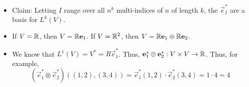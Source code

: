 \documentclass[../notes.tex]{subfiles}
\begin{document}
\begin{itemize}
    \item Claim: Letting $I$ range over all $n^k$ multi-indices of $n$ of length $k$, the $\vec{e}_I^*$ are a basis for $L^k(V)$.
    \item If $V=\mathbb{R}$, then $V=\mathbb{R}\mathbf{e}_1$. If $V=\mathbb{R}^2$, then $V=\mathbb{R}\mathbf{e}_1\oplus\mathbb{R}\mathbf{e}_2$.
    \item We know that $L^1(V)=V^*=R\vec{e}_1^*$. Thus, $\mathbf{e}_1^*\otimes\mathbf{e}_2^*:V\times V\to\mathbb{R}$. Thus, for example,
    \begin{equation*}
        (\vec{e}_1^*\otimes\vec{e}_2^*)((1,2),(3,4)) = \vec{e}_1^*(1,2)\cdot \vec{e}_2^*(3,4)
        = 1\cdot 4
        = 4
    \end{equation*}
\end{itemize}
\end{document}
